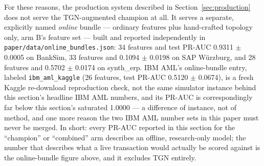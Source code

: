 For these reasons, the production system described in Section~\ref{sec:production} does not serve the TGN-augmented champion at all. It serves a separate, explicitly named \emph{online} bundle --- ordinary features plus hand-crafted topology only, arm B's feature set --- built and reported independently in \texttt{paper/data/online\_bundles.json}: 34 features and test PR-AUC 0.9311 $\pm$ 0.0005 on BankSim, 33 features and 0.1094 $\pm$ 0.0198 on SAP Würzburg, and 28 features and 0.5702 $\pm$ 0.0174 on synth\_erp. IBM AML's online-bundle entry, labeled \texttt{ibm\_aml\_kaggle} (26 features, test PR-AUC 0.5120 $\pm$ 0.0674), is a fresh Kaggle re-download reproduction check, not the same simulator instance behind this section's headline IBM AML numbers, and its PR-AUC is correspondingly far below this section's saturated 1.0000 --- a difference of instance, not of method, and one more reason the two IBM AML number sets in this paper must never be merged. In short: every PR-AUC reported in this section for the ``champion'' or ``combined'' arm describes an offline, research-only model; the number that describes what a live transaction would actually be scored against is the online-bundle figure above, and it excludes TGN entirely.
